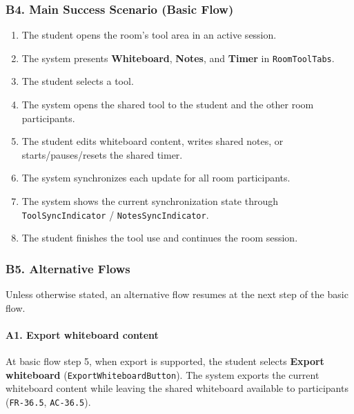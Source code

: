 \documentclass[12pt]{article}
\begin{document}
\subsubsection*{B4. Main Success Scenario (Basic Flow)}
\par\medskip

\begin{enumerate}
\item The student opens the room's tool area in an active session.
\item The system presents \textbf{Whiteboard}, \textbf{Notes}, and \textbf{Timer} in \texttt{RoomToolTabs}.
\item The student selects a tool.
\item The system opens the shared tool to the student and the other room participants.
\item The student edits whiteboard content, writes shared notes, or starts/pauses/resets the shared timer.
\item The system synchronizes each update for all room participants.
\item The system shows the current synchronization state through \texttt{ToolSyncIndicator} / \texttt{NotesSyncIndicator}.
\item The student finishes the tool use and continues the room session.
\end{enumerate}
\par\medskip

\hypertarget{sec:b5-alternative-flows}{}
\subsubsection*{B5. Alternative Flows}
\par\medskip

Unless otherwise stated, an alternative flow resumes at the next step of the basic flow.
\par\medskip

\hypertarget{sec:a1-export-whiteboard-content}{}
\paragraph*{A1. Export whiteboard content}
\par\medskip

At basic flow step 5, when export is supported, the student selects \textbf{Export whiteboard} (\texttt{ExportWhiteboardButton}). The system exports the current whiteboard content while leaving the shared whiteboard available to participants (\texttt{FR-36.5}, \texttt{AC-36.5}).
\par\medskip
\end{document}
